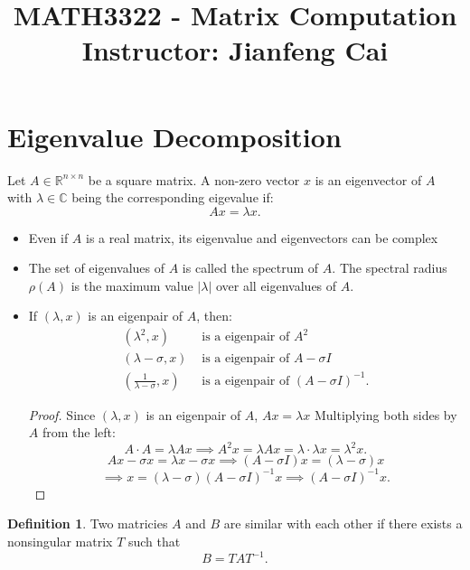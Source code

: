 \documentclass[12pt]{article}
\title{
{\LARGE MATH3322 - Matrix Computation} \\
\textbf{\large Instructor: Jianfeng Cai} 
}
\date{}
\theoremstyle{definition}
\newtheorem{definition}{Definition}
\newcommand{\R}{\mathbb{R}}
\newcommand{\C}{\mathbb{C}}
\begin{document}
\maketitle\thispagestyle{fancy}
\tableofcontents
\newpage

\section{Eigenvalue Decomposition}

	 Let $A \in \R^{n\times n}$ be a square matrix. A non-zero vector $x$ is an eigenvector of $A$ with  $\lambda\in \C$ being the corresponding eigevalue if: \[
		Ax=\lambda x		.\]  	

\begin{itemize}
		\itemsep0.3cm
				\item Even if $A$ is a real matrix, its eigenvalue and eigenvectors can be complex
				\item The set of eigenvalues of $A$ is called the spectrum of $A$. The spectral radius $\rho\left( A \right) $ is the maximum value $\left| \lambda \right| $ over all eigenvalues of $A$.
				\item If $\left(\lambda,x \right) $ is an eigenpair of $A$, then:
						\begin{align*}
								\left( \lambda^2,x \right) &\textrm{ is a eigenpair of }A^2\\
								\left( \lambda-\sigma,x \right) &\textrm{ is a eigenpair of }A-\sigma I\\
								\left( \frac{1}{\lambda-\sigma},x \right) &\textrm{ is a eigenpair of }\left( A-\sigma I \right) ^{-1}
						.\end{align*}
\begin{proof}
							Since $\left( \lambda,x \right) $ is an eigenpair of $A$, $Ax=\lambda x$ Multiplying both sides by $A$ from the left:\[
				A\cdot A=\lambda A x \implies A^2x=\lambda Ax=\lambda\cdot\lambda x=\lambda^2 x
				.\] 
				\[
						Ax-\sigma x=\lambda x-\sigma x \implies \left( A-\sigma I \right) x=\left( \lambda-\sigma\right)x\]\[\implies x=\left( \lambda-\sigma \right) \left( A-\sigma I \right) ^{-1}x\implies\left( A-\sigma I \right) ^{-1}x
				.\]		
\end{proof}
\end{itemize}
\begin{definition}
		Two matricies $A$ and $B$ are similar with each other if there exists a nonsingular matrix $T$ such that \[
		B=TAT^{-1}
		.\]  
\end{definition}
\end{document}
